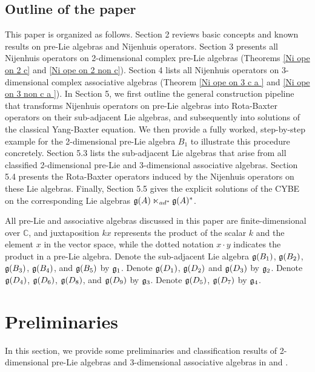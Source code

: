 \documentclass[12pt, reqno]{amsart}
\theoremstyle{plain}
\begin{document}
\subsection{Outline of the paper}

This paper is organized as follows. Section 2 reviews basic concepts and known results on pre-Lie algebras and Nijenhuis operators. Section 3 presents all Nijenhuis operators on 2-dimensional complex pre-Lie algebras (Theorems \ref{Ni ope on 2 c} and \ref{Ni ope on 2 non c}). Section 4 lists all Nijenhuis operators on 3-dimensional complex associative algebras (Theorem \ref{Ni ope on 3 c a } and \ref{Ni ope on 3 non c a }). In Section 5, we first outline the general construction pipeline that transforms Nijenhuis operators on pre-Lie algebras into Rota-Baxter operators on their sub-adjacent Lie algebras, and subsequently into solutions of the classical Yang-Baxter equation. We then provide a fully worked, step-by-step example for the 2-dimensional pre-Lie algebra \(B_1\) to illustrate this procedure concretely. Section 5.3 lists the sub-adjacent Lie algebras that arise from all classified 2-dimensional pre-Lie and 3-dimensional associative algebras. Section 5.4 presents the Rota-Baxter operators induced by the Nijenhuis operators on these Lie algebras. Finally, Section 5.5 gives the explicit solutions of the CYBE on the corresponding Lie algebras \({\frak g}(A) \ltimes_{{\rm ad}^{\ast}} {\frak g}(A)^{\ast}\).

All pre-Lie and associative algebras discussed in this paper are finite-dimensional over $\mathbb{C}$, and juxtaposition $kx$ represents the product of the scalar $k$ and the element $x$ in the vector space, while the dotted notation $x\cdot y$ indicates the product in a pre-Lie algebra. Denote the sub-adjacent Lie algebra ${\frak g}(B_1)$, ${\frak g}(B_2)$, ${\frak g}(B_3)$, ${\frak g}(B_4)$, and ${\frak g}(B_5)$ by ${\frak g_1}$.  Denote ${\frak g}(D_1)$, ${\frak g}(D_2)$ and ${\frak g}(D_3)$ by ${\frak g_2}$. Denote ${\frak g}(D_4)$, ${\frak g}(D_6)$, ${\frak g}(D_8)$, and ${\frak g}(D_9)$ by ${\frak g_3}$. Denote ${\frak g}(D_5)$, ${\frak g}(D_7)$ by ${\frak g_4}$.
\newpage

\section{Preliminaries}

In this section, we provide some preliminaries and classification results of 2-dimensional pre-Lie algebras  and 3-dimensional associative algebras in \cite{Burde, Bai-Meng} and \cite{Bai-1} .
\end{document}
